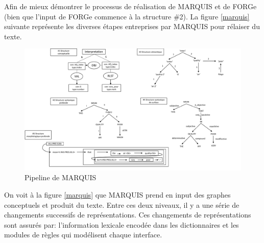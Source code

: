 Afin de mieux démontrer le processus de réalisation de MARQUIS et de FORGe (bien que l'input de FORGe commence à la structure \#2). La figure \ref{marquis} suivante représente les diverses étapes entreprises par MARQUIS pour rélaiser du texte.

\begin{figure}[htb]
	\centering
	\includegraphics[width=1\textwidth, trim = {0cm 0cm 0cm 0cm},clip]{ch2/figs/marquis.pdf}
	\caption{Pipeline de MARQUIS}
	\label{fig:marquis}
\end{figure}

On voit à la figure \ref{marquis} que MARQUIS prend en input des graphes conceptuels et produit du texte. Entre ces deux niveaux, il y a une série de changements successifs de représentations. Ces changements de représentations sont assurés par: l'information lexicale encodée dans les dictionnaires et les modules de règles qui modélisent chaque interface. 

